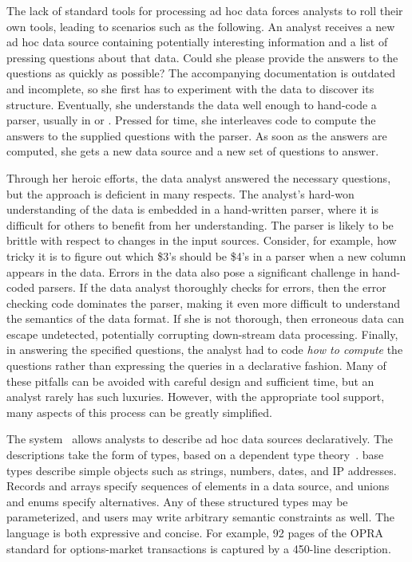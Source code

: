 The lack of standard tools for processing ad hoc data forces
analysts to roll their own tools, leading to scenarios such as the
following.  An analyst receives a new ad hoc data source containing
potentially interesting information and a list of pressing questions
about that data.  Could she please provide the answers to the
questions as quickly as possible?  The
accompanying documentation is outdated and incomplete, so she first has to experiment with the data to discover
its structure.   Eventually, she understands the data well enough to hand-code a
parser, usually in \C{} or \perl{}.  Pressed for time, she interleaves
code to compute the answers to the supplied questions with the parser.
As soon as the answers are computed, she gets a new data source and a
new set of questions to answer.

Through her heroic efforts, the data analyst answered the necessary
questions, but the approach is deficient in many respects.  The
analyst's hard-won understanding of the data is embedded in a
hand-written parser, where it is difficult for others to benefit from
her understanding.  The parser is likely to be brittle with respect to
changes in the input sources.  Consider, for example, how tricky it is
to figure out which \$3's should be \$4's in a \perl{} parser when a
new column appears in the data.  Errors in the data also pose a
significant challenge in hand-coded parsers.  If the data analyst
thoroughly checks for errors, then the error checking code dominates
the parser, making it even more difficult to understand the semantics
of the data format.  If she is not thorough, then erroneous data can
escape undetected, potentially corrupting down-stream
data processing.  Finally, in
answering the specified questions, the analyst had to code \textit{how
to compute} the questions rather than expressing the
queries in a declarative fashion.  Many of these pitfalls
can be avoided with careful design and sufficient time, but an analyst
rarely has such
luxuries.  However, with the
appropriate tool support, many aspects of this process can be greatly
simplified.

The \pads{} system~\cite{fisher+:pldi05} allows analysts to describe
ad hoc data sources declaratively.  The descriptions take the form of
types, based on a dependent type theory~\cite{fisher+:popl06}.
\pads{} base types describe simple objects such as strings, numbers,
dates, and IP addresses.  Records and arrays specify sequences
of elements in a data source, and unions and enums %
specify alternatives.  Any of these structured types may be
parameterized, and users may write arbitrary semantic constraints as
well.  The \pads{} language is both expressive and concise.  For
example, 92 pages of the OPRA standard for options-market transactions
is captured by a 450-line \pads{} description.

